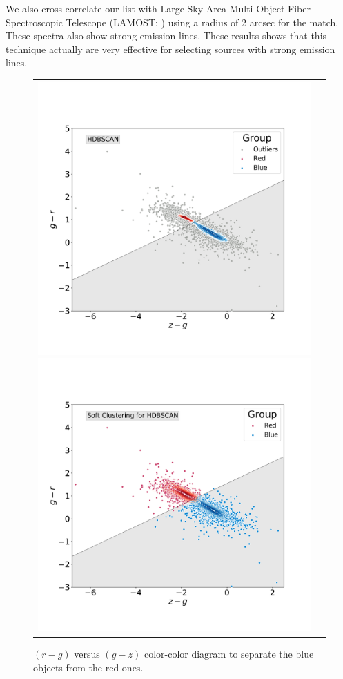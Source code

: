 \documentclass[fleqn,usenatbib]{mnras}
\begin{document}
We also cross-correlate our list with Large Sky Area Multi-Object Fiber Spectroscopic Telescope
(LAMOST; \citealp{Wu:2011}) using a radius of 2 arcsec for the match.  These spectra also
show strong emission lines. These results shows that this technique actually are very effective
for selecting sources with strong emission lines.


\begin{figure}
\centering
\begin{tabular}{l l}
  \includegraphics[width=0.5\linewidth, trim=10 10 5 8, clip]{Figs/blued-red-hdbscan.pdf}
   \includegraphics[width=0.5\linewidth, trim=10 10 5 8. clip]{Figs/blue-red-hdbscan-soft-alternative.pdf}
  \end{tabular}  
  \caption{ $(r - g)$ versus $(g - z)$ color-color diagram to separate the blue objects from the red ones.}
\label{fig:hdbscan}
\end{figure}
\end{document}
